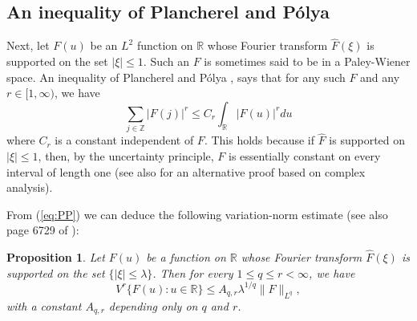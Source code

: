 \documentclass[12pt,leqno]{amsart}
\def\R{\mathbb{R}}
\def\Z{\mathbb{Z}}
\theoremstyle{plain}
\newtheorem{prop}[thm]{Proposition}
\numberwithin{equation}{section}
\begin{document}
\subsection{An inequality of Plancherel and P\'{o}lya}

Next, let $F(u)$ be an $L^2$ function on $\R$ whose Fourier transform $\widehat{F}(\xi)$ is supported on the set $|\xi| \leq 1$. Such an $F$ is sometimes said to be in a Paley-Wiener space. An inequality of Plancherel and P\'{o}lya \cite{PP37}, \cite{PP38} says that for any such $F$ and any $r \in [1,\infty)$, we have
\begin{equation} \label{eq:PP}
\sum_{j \in \Z} |F(j)|^r \leq C_r \int_{\R} |F(u)|^r du
\end{equation}
where $C_r$ is a constant independent of $F$. This holds because if $\widehat{F}$ is supported on $|\xi|\le 1$, then, by the uncertainty principle, $F$ is essentially constant on every interval of length one (see also  \cite{MR1836633} for an alternative proof based on complex analysis).

From (\ref{eq:PP}) we can deduce the following variation-norm estimate (see also page 6729 of \cite{MR2434308}):

\begin{prop}\label{PPinequality}
Let $F(u)$ be a function on $\R$ whose Fourier transform $\hat{F}(\xi)$ is supported on the set $\{|\xi| \leq \lambda\}$. Then for every $1 \leq q \leq r < \infty$, we have
\begin{equation} \label{eq:Variation}
V^r \{F(u) \colon u \in \R\} \leq A_{q,r} \lambda^{1/q} \|F\|_{L^q},
\end{equation}
with a constant $A_{q,r}$ depending only on $q$ and $r$.
\end{prop}
\end{document}

